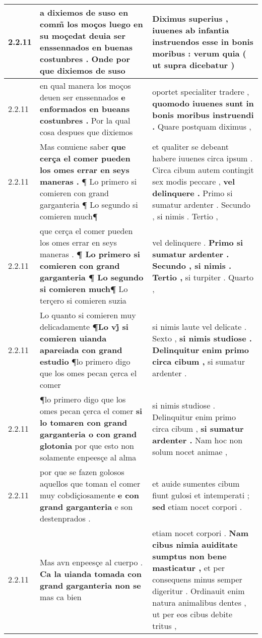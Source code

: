 \begin{tabular}{|p{1cm}|p{6.5cm}|p{6.5cm}|}
2.2.11 & a dixiemos de suso en comm̃ los moços \textbf{ luego en su moçedat deuia ser enssennados en buenas costunbres . } Onde por que dixiemos de suso & Diximus superius , iuuenes ab infantia \textbf{ instruendos esse in bonis moribus : } verum quia ( ut supra dicebatur ) \\\hline
2.2.11 & en qual manera los moços deuen ser enssennados \textbf{ e enformados en bueans costunbres . } Por la qual cosa despues que dixiemos & oportet specialiter tradere , \textbf{ quomodo iuuenes sunt in bonis moribus instruendi . } Quare postquam diximus , \\\hline
2.2.11 & Mas conuiene saber \textbf{ que cerça el comer pueden los omes errar en seys maneras . } ¶ Lo primero si comieren con grand garganteria ¶ Lo segundo si comieren much¶ & et qualiter se debeant habere iuuenes circa ipsum . Circa cibum autem contingit sex modis peccare , \textbf{ vel delinquere . } Primo si sumatur ardenter . Secundo , si nimis . Tertio , \\\hline
2.2.11 & que cerça el comer pueden los omes errar en seys maneras . \textbf{ ¶ Lo primero si comieren con grand garganteria ¶ Lo segundo si comieren much¶ } Lo terçero si comieren suzia & vel delinquere . \textbf{ Primo si sumatur ardenter . Secundo , si nimis . Tertio , } si turpiter . Quarto , \\\hline
2.2.11 & Lo quanto si comieren muy delicadamente \textbf{ ¶Lo vj̊ si comieren uianda apareiada con grand estudio } ¶lo primero digo que los omes pecan çerca el comer & si nimis laute vel delicate . Sexto , \textbf{ si nimis studiose . Delinquitur enim primo circa cibum , } si sumatur ardenter . \\\hline
2.2.11 & ¶lo primero digo que los omes pecan çerca el comer \textbf{ si lo tomaren con grand garganteria o con grand glotonia } por que esto non solamente enpeesçe al alma & si nimis studiose . Delinquitur enim primo circa cibum , \textbf{ si sumatur ardenter . } Nam hoc non solum nocet animae , \\\hline
2.2.11 & por que se fazen golosos aquellos que toman el comer muy cobdiçiosamente \textbf{ e con grand garganteria } e son destenprados . & et auide sumentes cibum fiunt gulosi et intemperati ; \textbf{ sed } etiam nocet corpori . \\\hline
2.2.11 & Mas avn enpeesçe al cuerpo . \textbf{ Ca la uianda tomada con grand garganteria non se } mas ca bien & etiam nocet corpori . \textbf{ Nam cibus nimia auiditate sumptus non bene masticatur , } et per consequens minus semper digeritur . Ordinauit enim natura animalibus dentes , ut per eos cibus debite tritus , \\\hline

\end{tabular}
